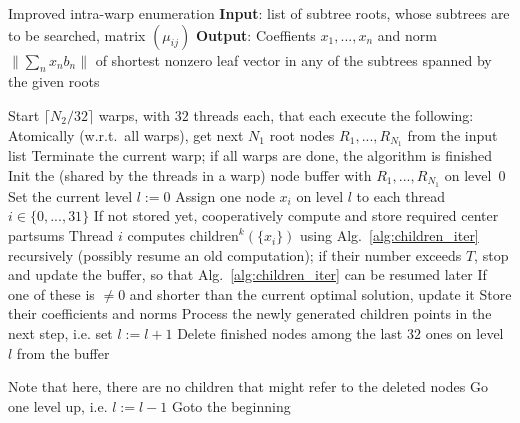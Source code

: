 \documentclass{scrartcl}
\begin{document}
    \begin{algorithm}
        \caption{
            Improved intra-warp enumeration\label{alg:warp_enum_complex}
            \newline
            \textbf{Input}: list of subtree roots, whose subtrees are to be searched, matrix $(\mu_{ij})$
            \newline
            \textbf{Output}: Coeffients $x_1, ..., x_n$ and norm $\| \sum_n x_n b_n \|$ of shortest nonzero leaf vector in any of the subtrees spanned by the given roots
        }
        \begin{algorithmic}
            \STATE Start $\lceil N_2 / 32 \rceil$ warps, with $32$ threads each, that each execute the following:
            \STATE Atomically (w.r.t.\ all warps), get next $N_1$ root nodes $R_1, ..., R_{N_1}$ from the input list
                \STATE Terminate the current warp; if all warps are done, the algorithm is finished
            \ENDIF
            \STATE Init the (shared by the threads in a warp) node buffer with $R_1, ..., R_{N_1}$ on level~0
            \STATE Set the current level $l := 0$
                    \STATE Assign one node $x_i$ on level $l$ to each thread $i \in \{0, ..., 31\}$
                    \STATE If not stored yet, cooperatively compute and store required center partsums
                    \STATE Thread $i$ computes $\mathrm{children}^k(\{x_i\})$ using Alg.\ \ref{alg:children_iter} recursively (possibly resume an old computation);
                    if their number exceeds $T$, stop and update the buffer, so that Alg.\ \ref{alg:children_iter} can be resumed later
                        \STATE If one of these is $\neq 0$ and shorter than the current optimal solution, update it
                    \ELSE
                        \STATE Store their coefficients and norms
                    \ENDIF
                \ENDWHILE
                    \STATE Process the newly generated children points in the next step, i.e. set $l := l + 1$
                \ELSE
                    \STATE Delete finished nodes among the last $32$ ones on level $l$ from the buffer

                    Note that here, there are no children that might refer to the deleted nodes
                        \STATE Go one level up, i.e. $l := l - 1$
                    \ENDIF
                \ENDIF
            \ENDWHILE
            \STATE Goto the beginning
        \end{algorithmic}
    \end{algorithm}
\end{document}
